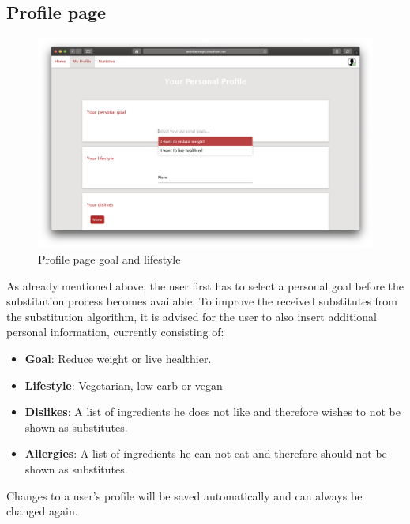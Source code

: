\subsection*{Profile page}
\vspace{0.5em}
\begin{figure}[H]
	\captionsetup{justification=centering}
	\begin{center}
		\includegraphics[scale=0.30]{Ressourcen/img/screenshots/screenshotO.png}
		\vspace{-2em}
		\caption{Profile page goal and lifestyle}
	\end{center}
\end{figure}
\vspace{-2em}
As already mentioned above, the user first has to select a personal goal before the substitution process becomes available. To improve the received substitutes from the substitution algorithm, it is advised for the user to also insert additional personal information, currently consisting of:

\begin{itemize}
\item \textbf{Goal}: Reduce weight or live healthier.
\item \textbf{Lifestyle}: Vegetarian, low carb or vegan
\item \textbf{Dislikes}: A list of ingredients he does not like and therefore wishes to not be shown as substitutes.
\item \textbf{Allergies}: A list of ingredients he can not eat and therefore should not be shown as substitutes.
\end{itemize}

Changes to a user’s profile will be saved automatically and can always be changed again.

